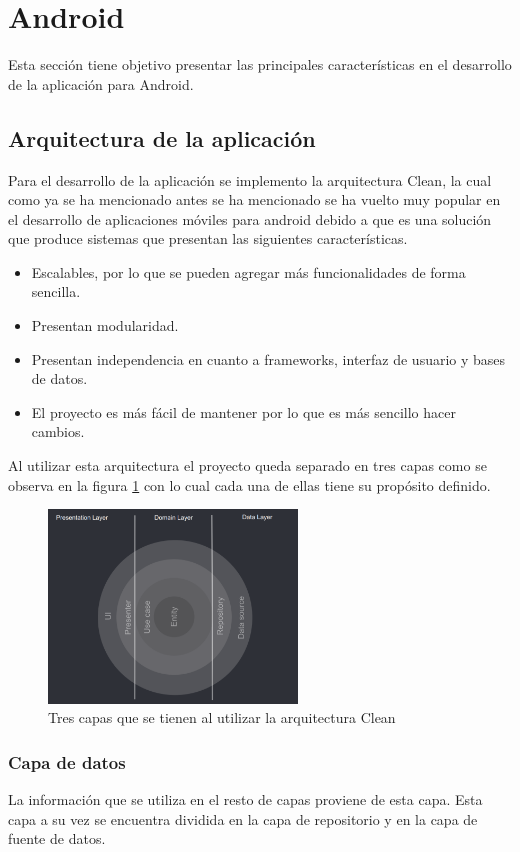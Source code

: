 \section{Android}
Esta sección tiene objetivo presentar las principales características en el desarrollo de la aplicación para Android.
\subsection{Arquitectura de la aplicación}
Para el desarrollo de la aplicación se implemento la arquitectura Clean, la cual como ya se ha mencionado antes se ha mencionado se ha vuelto muy popular en el desarrollo de aplicaciones móviles para android debido a que es una solución que produce sistemas que presentan las siguientes características.

\begin{itemize}
	\item Escalables, por lo que se pueden agregar más funcionalidades de forma sencilla.
	\item Presentan modularidad.
	\item Presentan independencia en cuanto a frameworks, interfaz de usuario y bases de datos.
	\item El proyecto es más fácil de mantener por lo que es más sencillo hacer cambios.
\end{itemize}

Al utilizar esta arquitectura el proyecto queda separado en tres capas como se observa en la figura \ref{fig:capas-arquitectura} con lo cual cada una de ellas tiene su propósito definido.

\begin{figure}[h]
	\centering
	\includegraphics[width=250px]{capitulo5/android/img/capas-clean.png}
	\caption{Tres capas que se tienen al utilizar la arquitectura Clean \cite{cleanGuide}}
	\label{fig:capas-arquitectura}
\end{figure}

\subsubsection{Capa de datos}
La información que se utiliza en el resto de capas proviene de esta capa. Esta capa a su vez se encuentra dividida en la capa de repositorio y en la capa de fuente de datos. 


